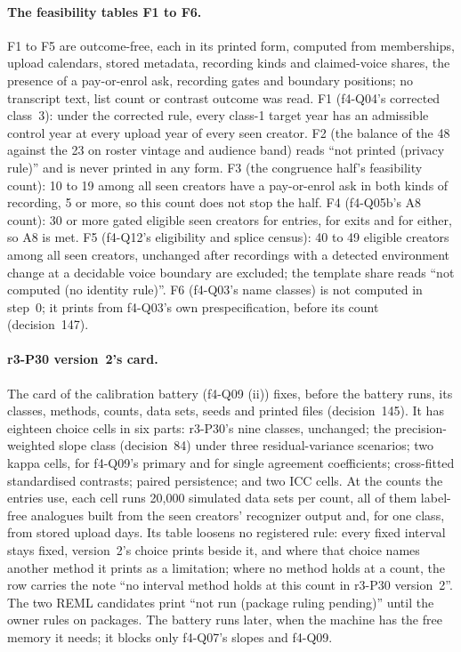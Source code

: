\paragraph{The feasibility tables F1 to F6.} F1 to F5 are outcome-free, each in its printed form, computed from memberships,
upload calendars, stored metadata, recording kinds and claimed-voice shares, the presence of a pay-or-enrol ask, recording
gates and boundary positions; no transcript text, list count or contrast outcome was read. F1 (f4-Q04's corrected
class~3): under the corrected rule, every class-1 target year has an admissible control year at every upload year of every
seen creator. F2 (the balance of the 48 against the 23 on roster vintage and audience band) reads ``not printed (privacy
rule)'' and is never printed in any form. F3 (the congruence half's feasibility count): 10 to 19 among all seen creators
have a pay-or-enrol ask in both kinds of recording, 5 or more, so this count does not stop the half. F4 (f4-Q05b's A8
count): 30 or more gated eligible seen creators for entries, for exits and for either, so A8 is met. F5 (f4-Q12's
eligibility and splice census): 40 to 49 eligible creators among all seen creators, unchanged after recordings with a
detected environment change at a decidable voice boundary are excluded; the template share reads ``not computed (no
identity rule)''. F6 (f4-Q03's name classes) is not computed in step~0; it prints from f4-Q03's own
prespecification, before its count (decision~147).

\paragraph{r3-P30 version~2's card.} The card of the calibration battery (f4-Q09 (ii)) fixes, before the battery runs,
its classes, methods, counts, data sets, seeds and printed files (decision~145). It has eighteen choice cells in six
parts: r3-P30's nine classes, unchanged; the precision-weighted slope class (decision~84) under three
residual-variance scenarios; two kappa cells, for f4-Q09's primary and for single agreement coefficients; cross-fitted
standardised contrasts; paired persistence; and two ICC cells. At the counts the entries use, each cell runs 20,000
simulated data sets per count, all of them label-free analogues built from the seen creators' recognizer output and, for
one class, from stored upload days. Its table loosens no registered rule: every fixed interval stays fixed, version~2's
choice prints beside it, and where that choice names another method it prints as a limitation; where no method holds at a
count, the row carries the note ``no interval method holds at this count in r3-P30 version~2''. The two REML candidates
print ``not run (package ruling pending)'' until the owner rules on packages. The battery runs later, when the machine has
the free memory it needs; it blocks only f4-Q07's slopes and f4-Q09.

